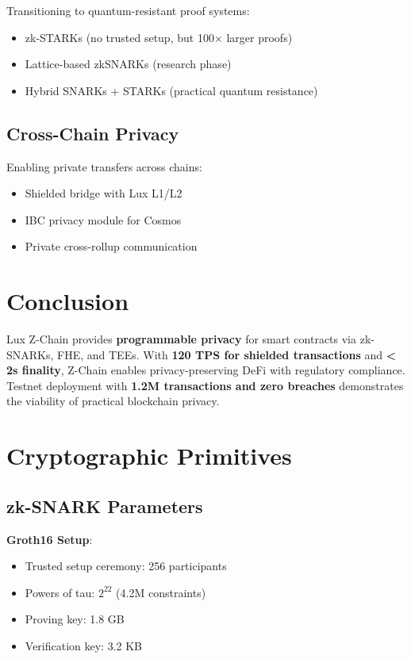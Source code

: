 \documentclass[11pt]{article}
\begin{document}
Transitioning to quantum-resistant proof systems:
\begin{itemize}[leftmargin=1.1em]
  \item zk-STARKs (no trusted setup, but 100× larger proofs)
  \item Lattice-based zkSNARKs (research phase)
  \item Hybrid SNARKs + STARKs (practical quantum resistance)
\end{itemize}

\subsection{Cross-Chain Privacy}

Enabling private transfers across chains:
\begin{itemize}[leftmargin=1.1em]
  \item Shielded bridge with Lux L1/L2
  \item IBC privacy module for Cosmos
  \item Private cross-rollup communication
\end{itemize}

\section{Conclusion}

Lux Z-Chain provides \textbf{programmable privacy} for smart contracts via zk-SNARKs, FHE, and TEEs. With \textbf{120 TPS for shielded transactions} and \textbf{< 2s finality}, Z-Chain enables privacy-preserving DeFi with regulatory compliance. Testnet deployment with \textbf{1.2M transactions and zero breaches} demonstrates the viability of practical blockchain privacy.

\appendix

\section{Cryptographic Primitives}

\subsection{zk-SNARK Parameters}

\textbf{Groth16 Setup}:
\begin{itemize}[leftmargin=1.1em]
  \item Trusted setup ceremony: 256 participants
  \item Powers of tau: $2^{22}$ (4.2M constraints)
  \item Proving key: 1.8 GB
  \item Verification key: 3.2 KB
\end{itemize}
\end{document}
